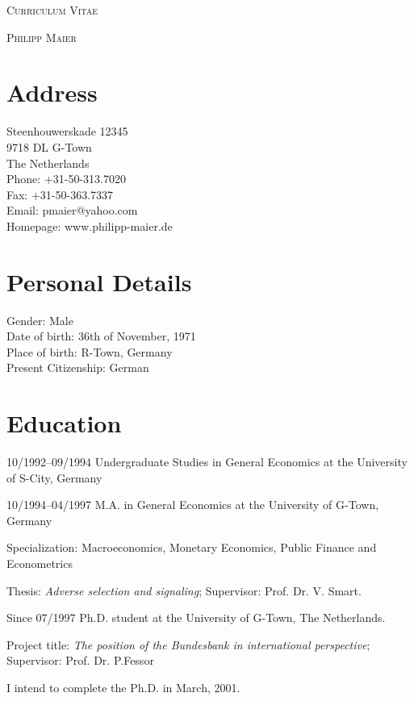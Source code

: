 \documentclass[a4paper]{article}
\begin{document}
\pagestyle{empty}

\begin{center}
\huge{\textsc{Curriculum Vitae}}
\vspace{\baselineskip}

\Large{\textsc{Philipp Maier}}
\end{center}
\vspace{1.5\baselineskip}

\section{Address}

\begin{flushleft}
  Steenhouwerskade 12345 \\
  9718 DL G-Town \\
  The Netherlands \\
  Phone: +31-50-313.7020 \\
  Fax: +31-50-363.7337 \\
  Email: pmaier@yahoo.com \\
  Homepage: www.philipp-maier.de\\
\end{flushleft}


\section{Personal Details}
\begin{flushleft}
  Gender: Male \\
  Date of birth: 36th of November, 1971 \\
  Place of birth: R-Town, Germany \\
  Present Citizenship: German
\end{flushleft}


\section{Education}

\begin{CV}
\item[10/1992--09/1994] Undergraduate Studies in General Economics at
  the University of S-City, Germany
\item[10/1994--04/1997] M.A. in General Economics at the University of
  G-Town, Germany

Specialization: Macroeconomics, Monetary Economics, Public Finance and Econometrics

Thesis: \emph{Adverse selection and signaling}; Supervisor: Prof. Dr. V. Smart.
\item[Since 07/1997] Ph.D. student at the University of G-Town,
  The Netherlands.

  Project title: \emph{The position of the Bundesbank in international perspective};
  Supervisor: Prof. Dr. P.Fessor

  I intend to complete the Ph.D. in March, 2001.
\end{CV}
\end{document}
